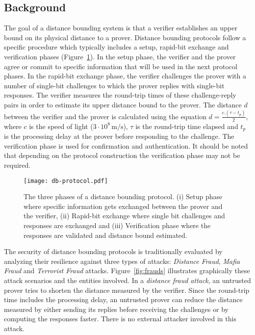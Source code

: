 \documentclass{sig-alternate-10pt}
\newcommand{\unit}[1]{\ensuremath{\, \mathrm{#1}}}
\begin{document}
\subsection{Background}
The goal of a distance bounding system is that a verifier establishes an upper
bound on its physical distance to a prover. Distance bounding protocols follow a
specific procedure which typically includes a setup, rapid-bit exchange and
verification phases (Figure~\ref{fig:db-protocol}). In the setup phase, the
verifier and the prover agree or commit to specific information that will be
used in the next protocol phases. In the rapid-bit exchange phase, the verifier
challenges the prover with a number of single-bit challenges to which the prover
replies with single-bit responses. The verifier measures the round-trip times of
these challenge-reply pairs in order to estimate its upper distance bound to the
prover. The distance $d$ between the verifier and the prover is calculated using
the equation $d = \frac{c.(\tau-t_p)}{2}$, where $c$ is the speed of light
($3\cdot10^8\unit{m/s}$), $\tau$ is the round-trip time elapsed and $t_p$ is the
processing delay at the prover before responding to the challenge. The
verification phase is used for confirmation and authentication. It should be
noted that depending on the protocol construction the verification phase may not
be required.

\begin{figure}[t]
  \centering
  \texttt{[image: db-protocol.pdf]}
  \caption{The three phases of a distance bounding protocol. (i) Setup phase
    where specific information gets exchanged between the prover and the
    verifier, (ii) Rapid-bit exchange where single bit challenges and responses
    are exchanged and (iii) Verification phase where the responses are
    validated and distance bound estimated.}
  \label{fig:db-protocol}
\end{figure}


The security of distance bounding protocols is traditionally evaluated by
analyzing their resilience against three types of attacks: \emph{Distance
  Fraud}, \emph{Mafia Fraud} and \emph{Terrorist Fraud} attacks.
Figure~\ref{fig:frauds} illustrates graphically these attack scenarios and the
entities involved. In a \emph{distance fraud attack}, an untrusted prover tries
to shorten the distance measured by the verifier. Since the round-trip time
includes the processing delay, an untrusted prover can reduce the distance
measured by either sending its replies before receiving the challenges or by
computing the responses faster. There is no external attacker involved in this
attack.
\end{document}
